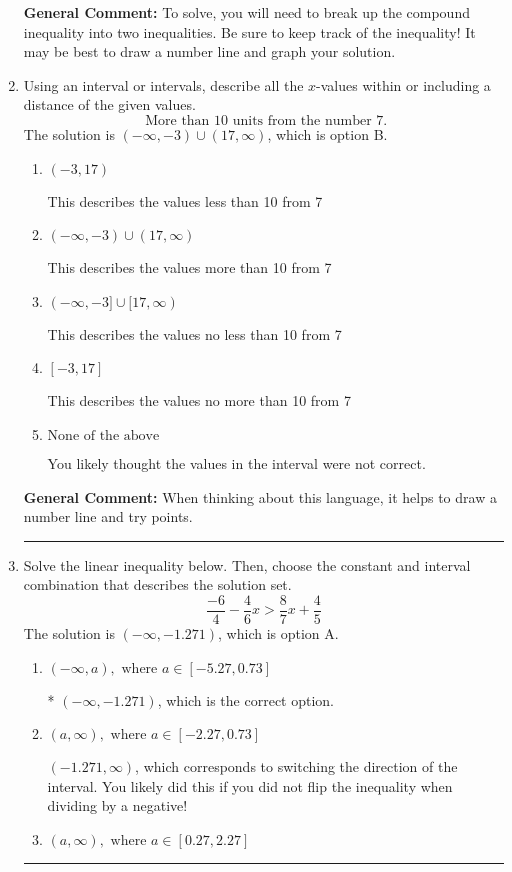 \documentclass{extbook}[14pt]
\newcommand{\litem}[1]{\item #1

\rule{\textwidth}{0.4pt}}
\begin{document}
\begin{enumerate}
{\begin{enumerate}[label=\Alph*.]
\end{enumerate}

\textbf{General Comment:} To solve, you will need to break up the compound inequality into two inequalities. Be sure to keep track of the inequality! It may be best to draw a number line and graph your solution.
}
\litem{
Using an interval or intervals, describe all the $x$-values within or including a distance of the given values.
\[ \text{ More than } 10 \text{ units from the number } 7. \]
The solution is \( (-\infty, -3) \cup (17, \infty) \), which is option B.\begin{enumerate}[label=\Alph*.]
\item \( (-3, 17) \)

This describes the values less than 10 from 7
\item \( (-\infty, -3) \cup (17, \infty) \)

This describes the values more than 10 from 7
\item \( (-\infty, -3] \cup [17, \infty) \)

This describes the values no less than 10 from 7
\item \( [-3, 17] \)

This describes the values no more than 10 from 7
\item \( \text{None of the above} \)

You likely thought the values in the interval were not correct.
\end{enumerate}

\textbf{General Comment:} When thinking about this language, it helps to draw a number line and try points.
}
\litem{
Solve the linear inequality below. Then, choose the constant and interval combination that describes the solution set.
\[ \frac{-6}{4} - \frac{4}{6} x > \frac{8}{7} x + \frac{4}{5} \]
The solution is \( (-\infty, -1.271) \), which is option A.\begin{enumerate}[label=\Alph*.]
\item \( (-\infty, a), \text{ where } a \in [-5.27, 0.73] \)

* $(-\infty, -1.271)$, which is the correct option.
\item \( (a, \infty), \text{ where } a \in [-2.27, 0.73] \)

 $(-1.271, \infty)$, which corresponds to switching the direction of the interval. You likely did this if you did not flip the inequality when dividing by a negative!
\item \( (a, \infty), \text{ where } a \in [0.27, 2.27] \)


\end{enumerate}}
\end{enumerate}
\end{document}
